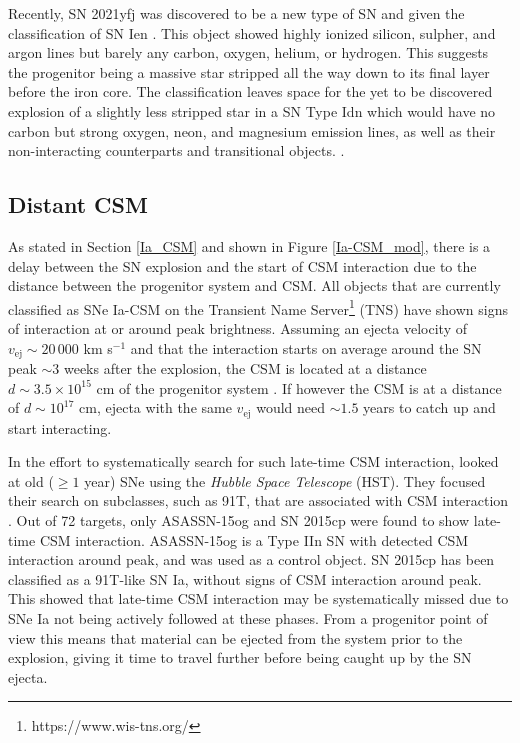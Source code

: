 \documentclass[a4paper,oneside,12pt, class=Latex/Classes/PhDthesisPSnPDF, crop=false]{standalone}
\begin{document}
Recently, SN 2021yfj was discovered to be a new type of SN and given the classification of SN Ien \citep{Ien_class}. This object showed highly ionized silicon, sulpher, and argon lines but barely any carbon, oxygen, helium, or hydrogen. This suggests the progenitor being a massive star stripped all the way down to its final layer before the iron core. The classification leaves space for the yet to be discovered explosion of a slightly less stripped star in a SN Type Idn which would have no carbon but strong oxygen, neon, and magnesium emission lines, as well as their non-interacting counterparts and transitional objects. \citep{Ien_disc}.


\subsection{Distant CSM}
As stated in Section \ref{Ia_CSM} and shown in Figure \ref{Ia-CSM_mod}, there is a delay between the SN explosion and the start of CSM interaction due to the distance between the progenitor system and CSM. All objects that are currently classified as SNe Ia-CSM on the Transient Name Server\footnote{https://www.wis-tns.org/} (TNS) have shown signs of interaction at or around peak brightness. Assuming an ejecta velocity of $v_\text{ej} \sim 20\,000$ km s$^{-1}$ and that the interaction starts on average around the SN peak $\sim3$ weeks after the explosion, the CSM is located at a distance $d\sim3.5\times10^{15}$ cm of the progenitor system \citep{Ia-CSM_BTS}. If however the CSM is at a distance of $d\sim10^{17}$ cm, ejecta with the same $v_\text{ej}$ would need $\sim1.5$ years to catch up and start interacting.

In the effort to systematically search for such late-time CSM interaction, \citet{2015cp} looked at old ($\geq1$ year) SNe using the \textit{Hubble Space Telescope} (HST). They focused their search on subclasses, such as 91T, that are associated with CSM interaction \citep{Ia-CSM_and_91T_connection}. Out of 72 targets, only ASASSN-15og and SN 2015cp were found to show late-time CSM interaction. ASASSN-15og is a Type IIn SN with detected CSM interaction around peak, and was used as a control object. SN 2015cp has been classified as a 91T-like SN Ia, without signs of CSM interaction around peak. This showed that late-time CSM interaction may be systematically missed due to SNe Ia not being actively followed at these phases. From a progenitor point of view this means that material can be ejected from the system prior to the explosion, giving it time to travel further before being caught up by the SN ejecta.
\end{document}

